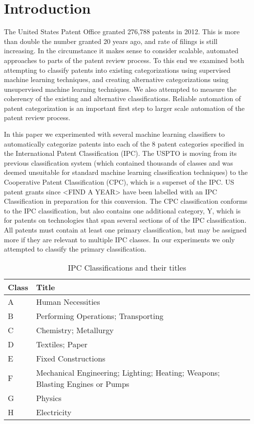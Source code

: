 \section{Introduction}
\indent
The United States Patent Office granted 276,788 patents in 2012\cite{USPTO:2013:stats}. This is more than double the number granted 20 years ago, and rate of filings is still increasing. In the circumstance it makes sense to consider scalable, automated approaches to parts of the patent review process. To this end we examined both attempting to classify patents into existing categorizations using supervised machine learning techniques, and creating alternative categorizations using unsupervised machine learning techniques. We also attempted to measure the coherency of the existing and alternative classifications. Reliable automation of patent categorization is an important first step to larger scale automation of the patent review process.

In this paper we experimented with several machine learning classifiers to automatically categorize patents into each of the 8 patent categories specified in the International Patent Classification\cite{ipc:2013:guide} (IPC). The USPTO is moving from its previous classification system (which contained thousands of classes and was deemed unsuitable for standard machine learning classification techniques) to the Cooperative Patent Classification (CPC), which is a superset of the IPC. US patent grants since <FIND A YEAR> have been labelled with an IPC Classification in preparation for this conversion. The CPC classification conforms to the IPC classification, but also contains one additional category, Y, which is for patents on technologies that span several sections of of the IPC classification. All patents must contain at least one primary classification, but may be assigned more if they are relevant to multiple IPC classes. In our experiments we only attempted to classify the primary classification.


\begin{table}[H]
	\centering
	\begin{tabular}{ | l | l |}
		\hline
		\textbf{Class} & \textbf{Title} \\
				\hline
		A & Human Necessities \\
				\hline
		B & Performing Operations; Transporting \\
				\hline
		C & Chemistry; Metallurgy \\
				\hline
		D & Textiles; Paper \\
				\hline
		E & Fixed Constructions \\
				\hline
		F & Mechanical Engineering; Lighting; Heating; Weapons; Blasting Engines or Pumps \\
		\hline
		G & Physics \\
				\hline
		H & Electricity \\
				\hline
	\end{tabular}
	\caption{IPC Classifications and their titles}
\end{table}



